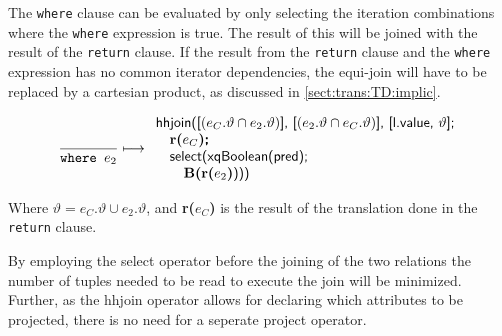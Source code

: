 The \texttt{where} clause can be evaluated by only selecting the iteration combinations where the \texttt{where}
expression is true. The result of this will be joined with the result of the \texttt{return} clause. If the result
from the \texttt{return} clause and the \texttt{where} expression has no common iterator dependencies, the
equi-join will have to be replaced by a cartesian product, as discussed in \ref{sect:trans:TD:implic}.

\begin{equation}
\frac{}{\mbox{\texttt{where }}e_2}\longmapsto
\begin{array}{l}
\mbox{\textsf{hhjoin([}}(e_{C}.\vartheta \cap e_2.\vartheta)\mbox{\textsf{], [}}(e_{2}.\vartheta \cap
e_{C}.\vartheta)\mbox{\textsf{], [l.value, }} \vartheta\mbox{\textsf{];}} \\ \quad
\mbox{\textbf{r(}}e_{C}\mbox{\textbf{)\textsf{;}}} \\ \quad
\mbox{\textsf{select(xqBoolean(pred);}} \\ \quad \quad
\mbox{\textbf{B(r(}}e_{2}\mbox{\textbf{)}\textsf{)))}}
\end{array}
\label{rule:trans:TD:where}
\end{equation}

Where $\vartheta = e_{C}.\vartheta \cup e_{2}.\vartheta$, and \textbf{r(}$e_{C}$\textbf{)} is the result of the
translation done in the \texttt{return} clause.

By employing the \textsf{select} operator before the joining of the two relations the number of tuples needed to
be read to execute the join will be minimized. Further, as the \textsf{hhjoin} operator allows for declaring which
attributes to be projected, there is no need for a seperate \textsf{project} operator.

